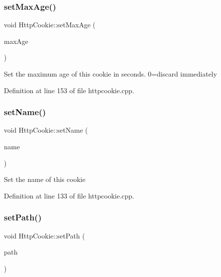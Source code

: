 \subsubsection{\texorpdfstring{set\+Max\+Age()}{setMaxAge()}}
{\footnotesize\ttfamily void Http\+Cookie\+::set\+Max\+Age (\begin{DoxyParamCaption}\item[{const int}]{max\+Age }\end{DoxyParamCaption})}

Set the maximum age of this cookie in seconds. 0=discard immediately 

Definition at line 153 of file httpcookie.\+cpp.

\mbox{\label{classstefanfrings_1_1_http_cookie_a209cfdd43a29ded9a93ac6ad3e4f75ef}} 
\subsubsection{\texorpdfstring{set\+Name()}{setName()}}
{\footnotesize\ttfamily void Http\+Cookie\+::set\+Name (\begin{DoxyParamCaption}\item[{const Q\+Byte\+Array}]{name }\end{DoxyParamCaption})}

Set the name of this cookie 

Definition at line 133 of file httpcookie.\+cpp.

\mbox{\label{classstefanfrings_1_1_http_cookie_a9e9cdfa3b356d95d9accb5ed8f5745e9}} 
\subsubsection{\texorpdfstring{set\+Path()}{setPath()}}
{\footnotesize\ttfamily void Http\+Cookie\+::set\+Path (\begin{DoxyParamCaption}\item[{const Q\+Byte\+Array}]{path }\end{DoxyParamCaption})}

